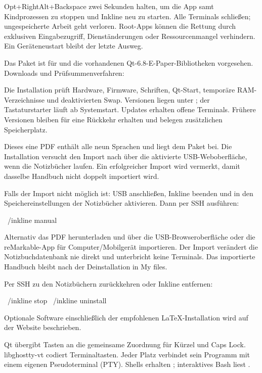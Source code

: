  Opt+RightAlt+Backspace zwei Sekunden halten, um die App samt
Kindprozessen zu stoppen und Inkline neu zu starten. Alle Terminals schließen;
ungespeicherte Arbeit geht verloren. Root-Apps können die Rettung durch
exklusiven Eingabezugriff, Dienständerungen oder Ressourcenmangel verhindern.
Ein Geräteneustart bleibt der letzte Ausweg.

Das Paket ist für  und die vorhandenen
Qt-6.8-E-Paper-Bibliotheken vorgesehen. Downloads und Prüfsummenverfahren:

\InstallLink

Die Installation prüft Hardware, Firmware, Schriften, Qt-Start, temporäre
RAM-Verzeichnisse und deaktivierten Swap. Versionen liegen unter
; der Tastaturstarter läuft ab Systemstart.
Updates erhalten offene Terminals.  Frühere Versionen bleiben für eine Rückkehr
erhalten und belegen zusätzlichen Speicherplatz.

Dieses eine PDF enthält alle neun Sprachen und liegt dem Paket bei.
Die Installation versucht den Import nach  über die aktivierte
USB-Weboberfläche, wenn die Notizbücher laufen. Ein erfolgreicher Import wird
vermerkt, damit dasselbe Handbuch nicht doppelt importiert wird.

Falls der Import nicht möglich ist: USB anschließen, Inkline beenden und
 in den Speichereinstellungen der Notizbücher aktivieren.
Dann per SSH ausführen:
\begin{shell}
~/inkline manual
\end{shell}
Alternativ das PDF herunterladen und über die USB-Browseroberfläche oder die
reMarkable-App für Computer/Mobilgerät importieren. Der Import verändert die
Notizbuchdatenbank nie direkt und unterbricht keine Terminals. Das importierte
Handbuch bleibt nach der Deinstallation in My files.

Per SSH zu den Notizbüchern zurückkehren oder Inkline entfernen:
\begin{shell}
~/inkline stop
~/inkline uninstall
\end{shell}
Optionale Software einschließlich der empfohlenen LaTeX-Installation wird
auf der Website beschrieben.

Qt übergibt Tasten an die gemeinsame Zuordnung für Kürzel und Caps Lock.
libghostty-vt codiert Terminaltasten. Jeder Platz verbindet sein Programm
mit einem eigenen Pseudoterminal (PTY). Shells erhalten
; interaktives Bash liest .

